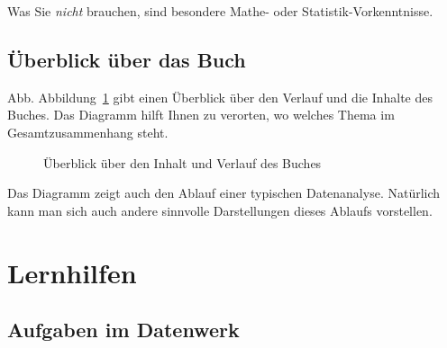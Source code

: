 \documentclass[
  a4paper,
]{scrbook}
\theoremstyle{definition}
\theoremstyle{definition}
\theoremstyle{definition}
\theoremstyle{remark}
\begin{document}
Was Sie \emph{nicht} brauchen, sind besondere Mathe- oder
Statistik-Vorkenntnisse.

\subsection{Überblick über das
Buch}\label{uxfcberblick-uxfcber-das-buch}

Abb. Abbildung~\ref{fig-ueberblick} gibt einen Überblick über den
Verlauf und die Inhalte des Buches. Das Diagramm hilft Ihnen zu
verorten, wo welches Thema im Gesamtzusammenhang steht.

\begin{figure}


\caption{\label{fig-ueberblick}Überblick über den Inhalt und Verlauf des
Buches}

\end{figure}%

Das Diagramm zeigt auch den Ablauf einer typischen Datenanalyse.
Natürlich kann man sich auch andere sinnvolle Darstellungen dieses
Ablaufs vorstellen.

\section{Lernhilfen}\label{lernhilfen}

\subsection{Aufgaben im Datenwerk}\label{aufgaben-im-datenwerk}
\end{document}
